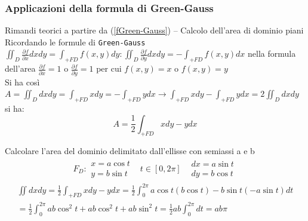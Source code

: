 \subsubsection{Applicazioni della formula di Green-Gauss}
Rimandi teorici a partire da (\ref{fGreen-Gauss}) -- Calcolo dell'area di
dominio piani\\
Ricordando le formule di \texttt{Green-Gauss} $\iint_D \frac{\partial
f}{\partial x}dxdy=\int_{+FD} f(x,y)dy:\iint_D \frac{\partial f}{\partial
y}dxdy =-\int_{+FD}f(x,y)dx$ nella formula dell'area $\frac{\partial
f}{\partial x}=1$ o $\frac{\partial f}{\partial y}=1$ per cui $f(x,y)=x$ o
$f(x,y)=y$\\
Si ha così $A=\iint_D dxdy=\int_{+FD}xdy=-\int_{+FD}ydx\to
\int_{+FD}xdy-\int_{+FD}ydx=2\iint_Ddxdy$ si ha:
\begin{equation*}
	\boxed{A=\frac{1}{2}\int_{+FD}xdy-ydx}
\end{equation*}
\clearpage
\begin{esempio}
	Calcolare l'area del dominio delimitato dall'ellisse con semiassi a e b
	\begin{eqnarray*}
		F_D:\begin{matrix}
			x=a\cos t \\
			y=b\sin t
		\end{matrix}& t\in [0,2\pi]&\begin{matrix}
			dx=a\sin t \\
			dy=b\cos t
		\end{matrix}
	\end{eqnarray*}
	\begin{eqnarray*}
		\iint dxdy= \frac{1}{2}\int_{+FD}xdy-ydx=\frac{1}{2}\int_{0}^{2\pi}a
		\cos t (b\cos t)- b\sin t (-a \sin
		t)dt\\=\frac{1}{2}\int_{0}^{2\pi}ab\cos^2t+ab\cos^2 t +
		ab\sin^2t=\frac{1}{2}ab\int_{0}^{2\pi}dt=ab\pi
	\end{eqnarray*}
\end{esempio}
